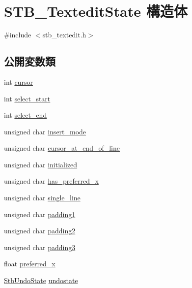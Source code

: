 \hypertarget{struct_s_t_b___textedit_state}{}\section{S\+T\+B\+\_\+\+Textedit\+State 構造体}
\label{struct_s_t_b___textedit_state}


{\ttfamily \#include $<$stb\+\_\+textedit.\+h$>$}

\subsection*{公開変数類}
\begin{DoxyCompactItemize}
\item 
int \mbox{\hyperlink{struct_s_t_b___textedit_state_a7a1414f3286070306a5184f9473ccf9f}{cursor}}
\item 
int \mbox{\hyperlink{struct_s_t_b___textedit_state_a74d595403e0b6f99cd0163ee87f4344d}{select\+\_\+start}}
\item 
int \mbox{\hyperlink{struct_s_t_b___textedit_state_abf8b1b1064770e4579c5bb8c4a41d8f0}{select\+\_\+end}}
\item 
unsigned char \mbox{\hyperlink{struct_s_t_b___textedit_state_af26029a4f1f76d043afd35072fabcb4b}{insert\+\_\+mode}}
\item 
unsigned char \mbox{\hyperlink{struct_s_t_b___textedit_state_a0e7ba5f610f5dc2d643bef0f223ada9c}{cursor\+\_\+at\+\_\+end\+\_\+of\+\_\+line}}
\item 
unsigned char \mbox{\hyperlink{struct_s_t_b___textedit_state_a11a63150e95225aacd204d6ef160c0c0}{initialized}}
\item 
unsigned char \mbox{\hyperlink{struct_s_t_b___textedit_state_aaca2d581ed565f86288038816274e007}{has\+\_\+preferred\+\_\+x}}
\item 
unsigned char \mbox{\hyperlink{struct_s_t_b___textedit_state_a63299aca2cb4e009dfa41cda5e651316}{single\+\_\+line}}
\item 
unsigned char \mbox{\hyperlink{struct_s_t_b___textedit_state_a1e43e8ac88a8c7f2bba645b333a8bdc7}{padding1}}
\item 
unsigned char \mbox{\hyperlink{struct_s_t_b___textedit_state_af5a708e49f23f79bb14c9b0f4ad03371}{padding2}}
\item 
unsigned char \mbox{\hyperlink{struct_s_t_b___textedit_state_a4c42530e4919171df25b1f00bb95a887}{padding3}}
\item 
float \mbox{\hyperlink{struct_s_t_b___textedit_state_a527319df94e0fe262548fb48bebf3dea}{preferred\+\_\+x}}
\item 
\mbox{\hyperlink{struct_stb_undo_state}{Stb\+Undo\+State}} \mbox{\hyperlink{struct_s_t_b___textedit_state_a7e1f0366bbd57e01a4f49a720beb9ead}{undostate}}
\end{DoxyCompactItemize}


